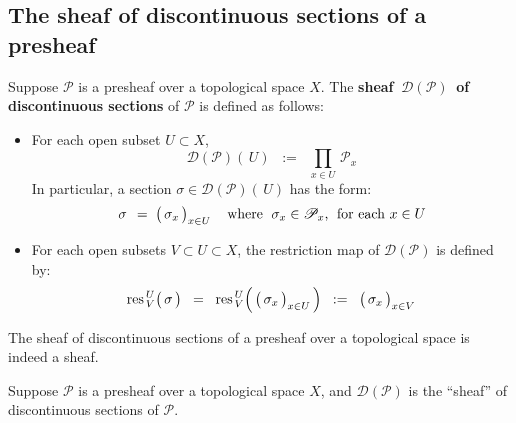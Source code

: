 
\vskip 0.5cm
\subsection{The sheaf of discontinuous sections of a presheaf}
\setcounter{theorem}{0}
\setcounter{equation}{0}


\vskip 0.5cm
\begin{definition}
\mbox{}\vskip 0.1cm
\noindent
Suppose $\mathscr{P}$ is a presheaf over a topological space $X$.
\vskip 0.1cm
\noindent
The \textbf{sheaf \,$\mathscr{D}(\mathscr{P})$\, of discontinuous sections} of $\mathscr{P}$
is defined as follows:
\begin{itemize}
\item
	For each open subset $U \subset X$,
	\begin{equation*}
	\mathscr{D}(\mathscr{P})(\,U)
	\;\; := \;\;
		\underset{x \in U}{\prod} \, \mathscr{P}_{x}
	\end{equation*}
	In particular, a section $\sigma \in \mathscr{D}(\mathscr{P})(\,U)$ has the form:
	\begin{equation*}
	\sigma
	\;\, = \;
		\left(\,\overset{{\color{white}.}}{\sigma_{x}}\,\right)_{x \in U}
	\quad
	\textnormal{where \;$\sigma_{x} \in \mathscr{P}_{x}$,\; for each $x \in U$}
	\end{equation*}
\item
	For each open subsets $V \subset U \subset X$,
	the restriction map of $\mathscr{D}(\mathscr{P})$ is defined by:
	\begin{equation*}
	\res^{\,U}_{\,V}\!\left(\,\overset{{\color{white}.}}{\sigma}\,\right)
	\;\; = \;\;
		\res^{\,U}_{\,V}\!\left(\,\left(\,\overset{{\color{white}.}}{\sigma_{x}}\,\right)_{x \in U}\,\right)
	\;\; := \;\;
		\left(\,\overset{{\color{white}.}}{\sigma_{x}}\,\right)_{x \in V}
	\end{equation*}
\end{itemize}
\end{definition}


\vskip 0.5cm
\begin{proposition}
\mbox{}\vskip 0.1cm
\noindent
The sheaf of discontinuous sections of a presheaf over a topological space is indeed a sheaf.
\end{proposition}
\proof
\vskip 0.3cm
\noindent
Suppose $\mathscr{P}$ is a presheaf over a topological space $X$, and
$\mathscr{D}(\mathscr{P})$ is the ``sheaf'' of discontinuous sections of $\mathscr{P}$.

